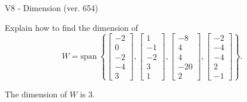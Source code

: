 \begin{exercise}
  \begin{exerciseTitle}V8 - Dimension (ver. 654)\end{exerciseTitle}
  \begin{exerciseStatement}
    Explain how to find the dimension of 
\[W=\mathrm{span}\ \left\{\left[\begin{array}{r}
-2 \\
0 \\
-2 \\
-4 \\
3
\end{array}\right] , \left[\begin{array}{r}
1 \\
-1 \\
-2 \\
3 \\
1
\end{array}\right] , \left[\begin{array}{r}
-8 \\
4 \\
4 \\
-20 \\
2
\end{array}\right] , \left[\begin{array}{r}
-2 \\
-4 \\
-4 \\
2 \\
-1
\end{array}\right]\right\}.\]



  \end{exerciseStatement}
  \begin{exerciseAnswer}
   The dimension of \(W\) is  \(3\).
  


  \end{exerciseAnswer}
\end{exercise}